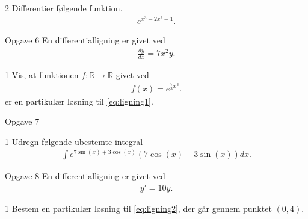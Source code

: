 \begin{delopgave}{}{2}
	Differentier følgende funktion.
	\begin{align*}
		 e^{x^3-2x^2-1}.
	\end{align*}
\end{delopgave}
\begin{opgavetekst}{Opgave 6}
	En differentialligning er givet ved
	\begin{align}\label{eq:ligning1}
		\frac{dy}{dx} = 7x^2y.
	\end{align}
\end{opgavetekst}
\begin{delopgave}{}{1}
	Vis, at funktionen $f:\mathbb{R} \to \mathbb{R}$ givet ved
	\begin{align*}
		f(x) = e^{\frac{7}{3}x^3}.
	\end{align*}
	er en partikulær løsning til \eqref{eq:ligning1}.
\end{delopgave}
\begin{opgavetekst}{Opgave 7}
\end{opgavetekst}
\begin{delopgave}{}{1}
	Udregn følgende ubestemte integral
	\begin{align*}
		\int e^{7\sin(x)+3\cos(x)}(7\cos(x)-3\sin(x))dx.
	\end{align*}
\end{delopgave}
\begin{opgavetekst}{Opgave 8}
	En differentialligning er givet ved
	\begin{align}\label{eq:ligning2}
		y' = 10y.
	\end{align}
\end{opgavetekst}
\begin{delopgave}{}{1}
	Bestem en partikulær løsning til \eqref{eq:ligning2}, der går gennem punktet $(0,4)$. 
\end{delopgave}

